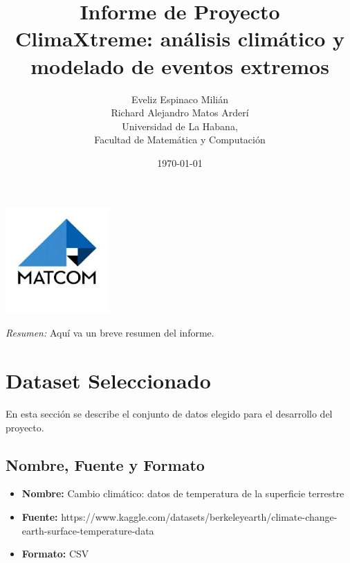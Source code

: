 \documentclass[12pt,a4paper]{scrartcl}
\title{\Huge\bfseries Informe de Proyecto\\[1ex] \Large ClimaXtreme: análisis climático y modelado de eventos extremos}
\author{Eveliz Espinaco Milián \\ Richard Alejandro Matos Arderí \\[1ex] \small Universidad de La Habana, \\Facultad de Matemática y Computación}
\date{\today}
\begin{document}
\maketitle
\thispagestyle{empty}
\begin{center}
    \includegraphics[width=0.3\textwidth]{matcom.jpeg} %
\end{center}
\vfill
\begin{center}
    \textit{Resumen:} Aquí va un breve resumen del informe.
\end{center}
\newpage

\tableofcontents

\newpage
\section{Dataset Seleccionado}
En esta sección se describe el conjunto de datos elegido para el desarrollo del proyecto.


\subsection{Nombre, Fuente y Formato}
\begin{itemize}
    \item \textbf{Nombre:} Cambio climático: datos de temperatura de la superficie terrestre
    \item \textbf{Fuente:} https://www.kaggle.com/datasets/berkeleyearth/climate-change-earth-surface-temperature-data
    \item \textbf{Formato:} CSV
\end{itemize}
\end{document}

